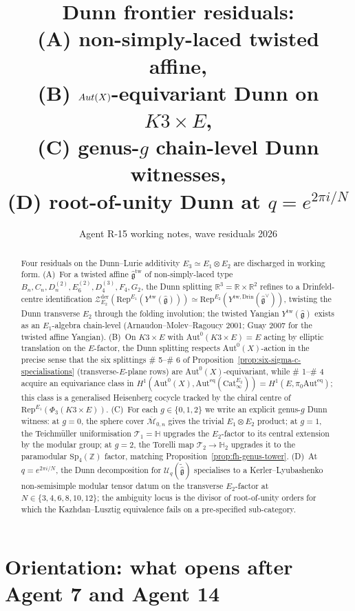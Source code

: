\documentclass[11pt]{article}
\title{Dunn frontier residuals: \\
  (A) non-simply-laced twisted affine, \\
  (B) $\Aut(X)$-equivariant Dunn on $K3 \times E$, \\
  (C) genus-$g$ chain-level Dunn witnesses, \\
  (D) root-of-unity Dunn at $q = e^{2\pi i/N}$}
\author{Agent R-15 working notes, wave residuals 2026}
\date{}
\newcommand{\Eone}{E_{1}}
\newcommand{\Etwo}{E_{2}}
\newcommand{\Ethree}{E_{3}}
\newcommand{\Cat}{\mathrm{Cat}}
\newcommand{\R}{\mathbb{R}}
\newcommand{\Z}{\mathbb{Z}}
\newcommand{\cM}{\mathcal{M}}
\newcommand{\cT}{\mathcal{T}}
\newcommand{\cU}{\mathcal{U}}
\newcommand{\cZ}{\mathcal{Z}}
\newcommand{\Rep}{\mathrm{Rep}}
\newcommand{\Aut}{\mathrm{Aut}}
\newcommand{\Auteq}{\mathrm{Aut}^{\mathrm{eq}}}
\newcommand{\frakg}{\mathfrak{g}}
\begin{document}
\maketitle

\begin{abstract}
Four residuals on the Dunn--Lurie additivity $\Ethree \simeq \Eone
\otimes \Etwo$ are discharged in working form. (A)~For a twisted
affine $\widehat{\frakg}^{\mathrm{tw}}$ of non-simply-laced type
$B_n, C_n, D_n^{(2)}, E_6^{(2)}, D_4^{(3)}, F_4, G_2$, the Dunn
splitting $\R^3 = \R \times \R^2$ refines to a Drinfeld-centre
identification $\cZ^{\mathrm{der}}_{\Etwo}(\Rep^{\Eone}(Y^{\mathrm{tw}}
(\widehat{\frakg}))) \simeq \Rep^{\Etwo}(Y^{\mathrm{tw,Drin}}
(\widehat{\frakg}^{\vee}))$, twisting the Dunn transverse $\Etwo$
through the folding involution; the twisted Yangian
$Y^{\mathrm{tw}}(\widehat{\frakg})$ exists as an $\Eone$-algebra
chain-level (Arnaudon--Molev--Ragoucy 2001; Guay 2007 for the twisted
affine Yangian). (B)~On $K3 \times E$ with
$\Aut^0(K3 \times E) = E$ acting by elliptic translation on the
$E$-factor, the Dunn splitting respects
$\Aut^0(X)$-action in the precise sense that the six splittings
\# 5--\# 6 of Proposition~\ref{prop:six-sigma-c-specialisations}
(transverse-$E$-plane rows) are $\Aut^0(X)$-equivariant, while \# 1--\# 4
acquire an equivariance class in
$H^1(\Aut^0(X), \Auteq(\Cat_\infty^{\Etwo}))
= H^1(E, \pi_0 \Auteq)$; this class is a generalised Heisenberg cocycle
tracked by the chiral centre of $\Rep^{\Eone}(\Phi_3(K3 \times E))$.
(C)~For each $g \in \{0, 1, 2\}$ we write an explicit genus-$g$ Dunn
witness: at $g = 0$, the sphere cover
$\overline{\cM}_{0, n}$ gives the trivial $\Eone \otimes \Etwo$
product; at $g = 1$, the Teichm\"uller uniformisation
$\cT_1 = \mathbb H$ upgrades the $\Etwo$-factor to its central
extension by the modular group; at $g = 2$, the Torelli map
$\cT_2 \to \mathbb H_2$ upgrades it to the paramodular $\mathrm{Sp}_4(\Z)$
factor, matching Proposition~\ref{prop:fh-genus-tower}.
(D)~At $q = e^{2\pi i/N}$, the Dunn decomposition for
$\cU_q(\widetilde{\widehat{\frakg}})$ specialises to a
Kerler--Lyubashenko non-semisimple modular tensor datum on the
transverse $\Etwo$-factor at $N \in \{3, 4, 6, 8, 10, 12\}$; the
ambiguity locus is the divisor of root-of-unity orders for which the
Kazhdan--Lusztig equivalence fails on a pre-specified sub-category.
\end{abstract}

\tableofcontents

\section{Orientation: what opens after Agent 7 and Agent 14}
\label{sec:orientation-residuals}
\end{document}
